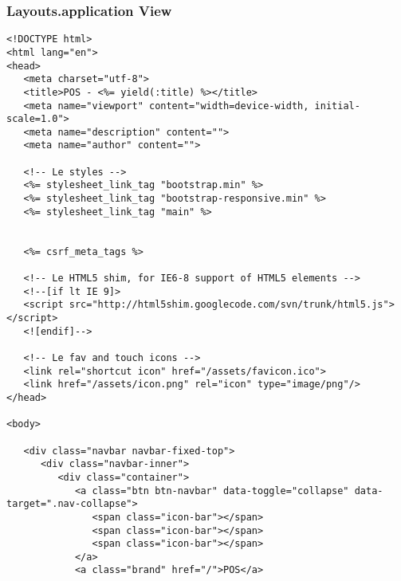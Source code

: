 \documentclass[a4paper]{article}
\begin{document}
\subsubsection{Layouts.application View}
\begin{verbatim}
<!DOCTYPE html>
<html lang="en">
<head>
   <meta charset="utf-8">
   <title>POS - <%= yield(:title) %></title>
   <meta name="viewport" content="width=device-width, initial-scale=1.0">
   <meta name="description" content="">
   <meta name="author" content="">

   <!-- Le styles -->
   <%= stylesheet_link_tag "bootstrap.min" %>
   <%= stylesheet_link_tag "bootstrap-responsive.min" %>
   <%= stylesheet_link_tag "main" %>


   <%= csrf_meta_tags %>

   <!-- Le HTML5 shim, for IE6-8 support of HTML5 elements -->
   <!--[if lt IE 9]>
   <script src="http://html5shim.googlecode.com/svn/trunk/html5.js"></script>
   <![endif]-->

   <!-- Le fav and touch icons -->
   <link rel="shortcut icon" href="/assets/favicon.ico">
   <link href="/assets/icon.png" rel="icon" type="image/png"/>
</head>

<body>

   <div class="navbar navbar-fixed-top">
      <div class="navbar-inner">
         <div class="container">
            <a class="btn btn-navbar" data-toggle="collapse" data-target=".nav-collapse">
               <span class="icon-bar"></span>
               <span class="icon-bar"></span>
               <span class="icon-bar"></span>
            </a>
            <a class="brand" href="/">POS</a>



\end{verbatim}
\end{document}
